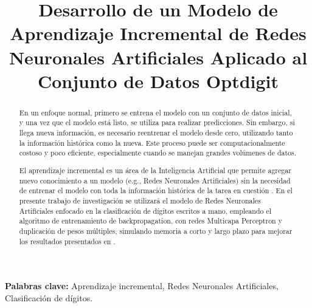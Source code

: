 \documentclass[10pt,a4paper]{article}
\title{Desarrollo de un Modelo de Aprendizaje Incremental de Redes Neuronales Artificiales Aplicado al Conjunto de
Datos Optdigit}
\begin{document}
    
    \tableofcontents
    \listoffigures
    \maketitle
    \begin{abstract}
        En un enfoque normal, primero se entrena el modelo con un conjunto de datos inicial, y una vez que el modelo está listo, se utiliza para realizar predicciones. Sin embargo, si llega nueva información, es necesario reentrenar el modelo desde cero, utilizando tanto la información histórica como la nueva. Este proceso puede ser computacionalmente costoso y poco eficiente, especialmente cuando se manejan grandes volúmenes de datos.
        
        El aprendizaje incremental es un área de la Inteligencia Artificial que permite agregar nuevo conocimiento a un modelo (e.g., Redes Neuronales Artificiales) sin la necesidad de entrenar el modelo con toda la información histórica de la tarea en cuestión \cite{bullinaria2009}. En el presente trabajo de investigación se utilizará el modelo de Redes Neuronales Artificiales enfocado en la clasificación de dígitos escritos a mano, empleando el algoritmo de entrenamiento de backpropagation, con redes Multicapa Perceptron y duplicación de pesos múltiples, simulando memoria a corto y largo plazo para mejorar los resultados presentados en \cite{bullinaria2009}.
        \end{abstract}
        
        \textbf{Palabras clave:} Aprendizaje incremental, Redes Neuronales Artificiales, Clasificación de dígitos.

    
    
    
    
    
    
    
    
    
    
    
    
    
    
\end{document}
